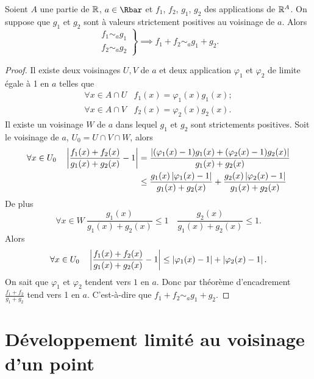 \begin{prop}
  Soient $A$ une partie de $\mathbb{R}$, $a \in \Rbar$ et $f_1$, $f_2$, $g_1$, $g_2$ des applications de $\mathbb{R}^A$. On suppose que $g_1$ et $g_2$ sont à valeurs strictement positives au voisinage de $a$. Alors
  \begin{equation}
    \left.
    \begin{array}{l}
      f_1 \sim_a g_1 \\ f_2 \sim_a g_2
    \end{array}
    \right \}
    \implies f_1+f_2 \sim_a g_1+g_2.
  \end{equation}
\end{prop}
\begin{proof}
  Il existe deux voisinages $U,V$ de $a$ et deux application $\varphi_1$ et $\varphi_2$ de limite égale à 1 en $a$ telles que
  \begin{align}
    \forall x \in A\cap U & f_1(x)=\varphi_1(x) g_1(x); \\
    \forall x \in A\cap V & f_2(x)=\varphi_2(x) g_2(x).
  \end{align}
  Il existe un voisinage $W$ de $a$ dans lequel $g_1$ et $g_2$ sont strictements positives. Soit le voisinage de $a$, $U_0=U \cap V \cap W$, alors
  \begin{align}
    \forall x \in U_0 \quad \left\lvert\frac{f_1(x)+f_2(x)}{g_1(x)+g_2(x)} - 1\right\rvert & =\frac{\left\lvert(\varphi_1(x)-1)g_1(x) + (\varphi_2(x)-1)g_2(x)\right\rvert}{g_1(x)+g_2(x)}\\
    & \leq \frac{g_1(x)\left\lvert\varphi_1(x) -1\right\rvert}{g_1(x)+g_2(x)} + \frac{g_2(x)\left\lvert\varphi_2(x) -1\right\rvert}{g_1(x)+g_2(x)}
  \end{align}
  De plus
  \begin{equation}
    \forall x \in W \ \frac{g_1(x)}{g_1(x)+g_2(x)} \leq 1 \quad \frac{g_2(x)}{g_1(x)+g_2(x)} \leq 1.
  \end{equation}
  Alors
  \begin{equation}
    \forall x \in U_0 \quad \left\lvert\frac{f_1(x)+f_2(x)}{g_1(x)+g_2(x)} - 1\right\rvert \leq \left\lvert\varphi_1(x) -1\right\rvert + \left\lvert\varphi_2(x) -1\right\rvert.
  \end{equation}
  On sait que $\varphi_1$ et $\varphi_2$ tendent vers $1$ en $a$. Donc par théorème d'encadrement $\frac{f_1+f_2}{g_1+g_2}$ tend vers 1 en $a$. C'est-à-dire que $f_1+f_2 \sim_a g_1+g_2$.
\end{proof}

\section{Développement limité au voisinage d'un point}

